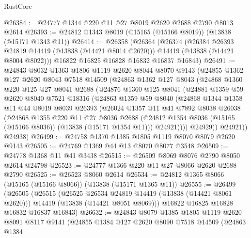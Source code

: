 \begin{lexlean}{RustCore}
\begin{coremodule}
@26384 := @24777 @1344 @220 @11 @27 @8019 @2620 @2688 @2790 @8013 @2614
@26393 := @24812 @1343 @8019 (@15165 (@15166 @8019)) (@13838 (@15171 @1343 @11))
@26414 := @26358
    (@26364
      (@26374
        (@26384 @26393 @24819 @14419 (@13838 (@14421 @8014 @2620)))
        @14419
        (@13838 (@14421 @8004 @8022)))
      @16822
      @16825
      @16828
      @16832
      @16837
      @16843)
@26491 := @24843
    @8032
    @1363
    @1806
    @1119
    @2620
    @8044
    @8070
    @9143
    (@24855
      @1362
      @127
      @2620
      @8043
      @7518
      @14509
      (@24863
        @1362
        @127
        @8043
        (@24868
          @1360
          @220
          @125
          @27
          @8041
          @2688
          (@24876
            @1360
            @125
            @8041
            (@24881
              @1359
              @59
              @2620
              @8040
              @7521
              @18316
              (@24863
                @1359
                @59
                @8040
                (@24868
                  @1344
                  @1358
                  @11
                  @44
                  @8019
                  @8039
                  @26393
                  (@26024
                    @1357
                    @11
                    @41
                    @7892
                    @8038
                    @26038
                    (@24868
                      @1355
                      @220
                      @11
                      @27
                      @8036
                      @2688
                      (@24812 @1354 @8036 (@15165 (@15166 @8036)) (@13838 (@15171 @1354 @11)))
                      @24921))))
              @24929))
          @24921))
      @24938)
@26499 := @24758 @1370 @1385 @1805 @1119 @8070 @8079 @2620 @9143
@26505 := @24769 @1369 @44 @13 @8070 @8077 @3548
@26509 := @24778 @1368 @11 @41 @3438
@26515 := @26509 @8069 @8076 @2790 @8050 @2614 @24798
@26523 := @24777 @1366 @220 @11 @27 @8066 @2620 @2688 @2790
@26525 := @26523 @8060 @2614
@26534 := @24812 @1365 @8066 (@15165 (@15166 @8066)) (@13838 (@15171 @1365 @11))
@26555 := @26499
    (@26505
      (@26515
        (@26525 @26534 @24819 @14419 (@13838 (@14421 @8061 @2620)))
        @14419
        (@13838 (@14421 @8051 @8069)))
      @16822
      @16825
      @16828
      @16832
      @16837
      @16843)
@26632 := @24843
    @8079
    @1385
    @1805
    @1119
    @2620
    @8091
    @8117
    @9141
    (@24855
      @1384
      @127
      @2620
      @8090
      @7518
      @14509
      (@24863
        @1384

\end{coremodule}
\end{lexlean}
